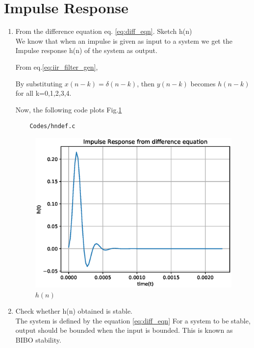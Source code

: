 \documentclass[journal,12pt,twocolumn]{IEEEtran}
\renewcommand\thesection{\arabic{section}}
\begin{document}
\section{Impulse Response}
\begin{enumerate}[label=\thesection.\arabic*,ref=\thesection.\theenumi]
\item
From the difference equation eq. \ref{eq:diff_eqn}. Sketch h(n)
\label{prob:h(n)}
\\
\solution
We know that when an impulse is given as input to a system we get the Impulse response h(n) of the system as output.

From eq.\ref{eq:iir_filter_gen}, 

By substituting $x(n-k) = \delta(n-k)$, then $y(n-k)$ becomes $h(n-k)$ for all k=0,1,2,3,4.

Now, the following code plots Fig.\ref{fig:h(n)}
\begin{lstlisting}
    Codes/hndef.c
\end{lstlisting}
\begin{figure}[!ht]
\centering
\includegraphics[width=\columnwidth]{./figs/h(n).eps}
\caption{$h(n)$}
\label{fig:h(n)}
\end{figure}

\item Check whether h(n) obtained is stable.
\\
\solution
The system is defined by the equation \ref{eq:diff_eqn} 
For a system to be stable, output should be bounded when the input is bounded. This is known as BIBO stability.


\end{enumerate}
\end{document}
